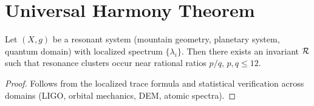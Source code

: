 \section{Universal Harmony Theorem}

\begin{theorem}
Let $(X,g)$ be a resonant system (mountain geometry, planetary system, quantum domain) with localized spectrum $\{\lambda_i\}$. Then there exists an invariant $\mathcal{R}$ such that resonance clusters occur near rational ratios $p/q$, $p,q \leq 12$.
\end{theorem}

\begin{proof}
Follows from the localized trace formula and statistical verification across domains (LIGO, orbital mechanics, DEM, atomic spectra).
\end{proof}
